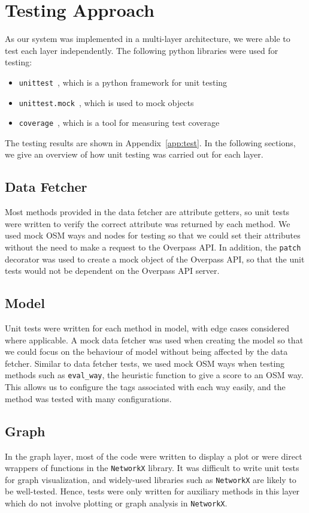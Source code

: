 \documentclass[12pt,a4paper]{report}
\begin{document}
\section{Testing Approach}\label{sec:testing}
As our system was implemented in a multi-layer architecture, we were able to test each layer independently. The following python libraries were used for testing:
\begin{itemize}
    \item \texttt{unittest}~\cite{unittest}, which is a python framework for unit testing
    \item \texttt{unittest.mock}~\cite{unittest:mock}, which is used to mock objects
    \item \texttt{coverage}~\cite{coverage}, which is a tool for measuring test coverage
\end{itemize}

The testing results are shown in Appendix~\ref{app:test}. In the following sections, we give an overview of how unit testing was carried out for each layer.

\subsection{Data Fetcher}
Most methods provided in the data fetcher are attribute getters, so unit tests were written to verify the correct attribute was returned by each method. We used mock OSM ways and nodes for testing so that we could set their attributes without the need to make a request to the Overpass API. In addition, the \texttt{patch} decorator was used to create a mock object of the Overpass API, so that the unit tests would not be dependent on the Overpass API server.

\subsection{Model}
Unit tests were written for each method in model, with edge cases considered where applicable. A mock data fetcher was used when creating the model so that we could focus on the behaviour of model without being affected by the data fetcher. Similar to data fetcher tests, we used mock OSM ways when testing methods such as \texttt{eval\_way}, the heuristic function to give a score to an OSM way. This allows us to configure the tags associated with each way easily, and the method was tested with many configurations.

\subsection{Graph}
In the graph layer, most of the code were written to display a plot or were direct wrappers of functions in the \texttt{NetworkX} library. It was difficult to write unit tests for graph visualization, and widely-used libraries such as \texttt{NetworkX} are likely to be well-tested. Hence, tests were only written for auxiliary methods in this layer which do not involve plotting or graph analysis in \texttt{NetworkX}.
\end{document}
